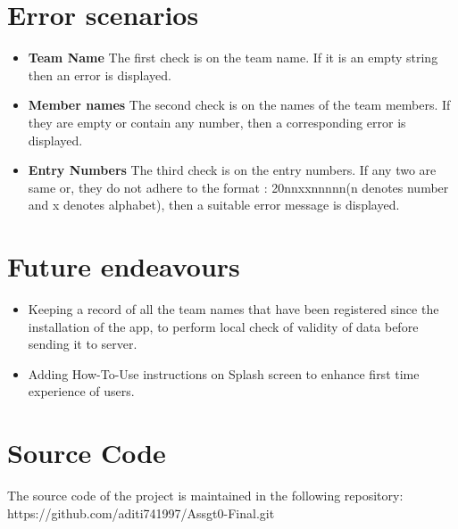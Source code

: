 \documentclass{article}
\begin{document}
\section{Error scenarios}
\begin{itemize}
\item \textbf{Team Name} The first check is on the team name. If it is an empty string then an error is displayed.
\item \textbf{Member names} The second check is on the names of the team members. If they are empty or contain any number, then a corresponding error is displayed.
\item \textbf{Entry Numbers} The third check is on the entry numbers. If any two are same or, they do not adhere to the format : 20nnxxnnnnn(n denotes number and x denotes alphabet), then a suitable error message is displayed.
\end{itemize}


\section{Future endeavours}
\begin{itemize}
\item Keeping a record of all the team names that have been registered since the installation of the app, to perform local check of validity of data before sending it to server.
\item Adding How-To-Use instructions on Splash screen to enhance first time experience of users.
\end{itemize}


\section{Source Code}
\par\noindent The source code of the project is maintained in the following repository:\\
https://github.com/aditi741997/Assgt0-Final.git

% 
% 
\end{document}
